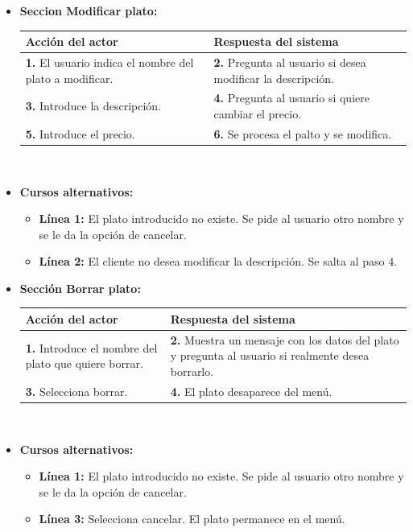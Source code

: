 \documentclass[spanish,a4paper,11pt, twoside]{report}	%
\begin{document}
\begin{itemize}
			\item \textbf{Seccion Modificar plato:} 	\\
				\begin{tabular}{|p{6cm}||p{6cm}|}
				\hline
				\textbf{Acción del actor} & \textbf{Respuesta del sistema} \\ \hline \hline
				\textbf{1.} El usuario indica el nombre del plato a modificar. & 
				\textbf{2.} Pregunta al usuario si desea modificar la descripción. \\ \hline
				\textbf{3.} Introduce la descripción.	& 
				\textbf{4.} Pregunta al usuario si quiere cambiar el precio. \\ \hline
				\textbf{5.} Introduce el precio. & 
				\textbf{6.} Se procesa el palto y se modifica. \\ \hline
			\end{tabular}
			\\
			\item \textbf{Cursos alternativos:} 
			\begin{itemize}
				\item  \textbf{Línea 1:} El plato introducido no existe. Se pide al usuario otro
				nombre y se le da la opción de cancelar.
				\item  \textbf{Línea 2:} El cliente no desea modificar la descripción. Se salta
				al paso 4.

			\end {itemize}
			
			\item \textbf{Sección Borrar plato:} 	\\
				\begin{tabular}{|p{6cm}||p{6cm}|}
				\hline
				\textbf{Acción del actor} & \textbf{Respuesta del sistema} \\ \hline \hline
				\textbf{1.} Introduce el nombre del plato que quiere borrar. & 
				\textbf{2.} Muestra un mensaje con los datos del plato
					y pregunta al usuario si realmente desea borrarlo.\\ \hline 
				\textbf{3.} Selecciona borrar. & 
				\textbf{4.} El plato desaparece del menú. \\ \hline
			\end{tabular}
			\\
			\item \textbf{Cursos alternativos:} 
			\begin{itemize}
				\item  \textbf{Línea 1:} El plato introducido no existe. Se pide al usuario otro nombre y 
					se le da la opción de cancelar.
				\item  \textbf{Línea 3:} Selecciona cancelar. El plato permanece en el menú.
			\end {itemize}
		\end {itemize}
\end{document}
